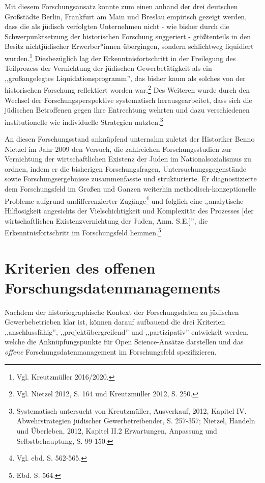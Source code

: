 Mit diesem Forschungsansatz konnte zum einen anhand der drei deutschen Großstädte Berlin, Frankfurt am Main und Breslau empirisch  gezeigt werden, dass die als jüdisch verfolgten Unternehmen nicht - wie bisher durch die Schwerpunktsetzung der historischen Forschung suggeriert - größtenteils in den Besitz nichtjüdischer Erwerber*innen übergingen, sondern schlichtweg liquidiert wurden.\footnote{Vgl. Kreutzmüller 2016/2020.} Diesbezüglich lag der Erkenntnisfortschritt in der Freilegung des Teilprozess der Vernichtung der jüdischen Gewerbetätigkeit als ein ,,großangelegtes Liquidationsprogramm'', das bisher kaum als solches von der historischen Forschung reflektiert worden war.\footnote{Vgl. Nietzel 2012, S. 164 und Kreutzmüller 2012, S. 250.} Des Weiteren wurde durch den Wechsel der Forschungsperspektive systematisch herausgearbeitet, dass sich die jüdischen Betroffenen gegen ihre Entrechtung wehrten und dazu verschiedenen institutionelle wie individuelle Strategien nutzten.\footnote{Systematisch untersucht von Kreutzmüller, Ausverkauf, 2012, Kapitel IV. Abwehrstrategien jüdischer Gewerbetreibender, S. 257-357; Nietzel, Handeln und Überleben, 2012, Kapitel II.2 Erwartungen, Anpassung und Selbstbehauptung, S. 99-150.}

An diesen Forschungsstand anknüpfend unternahm zuletzt der Historiker Benno Nietzel im Jahr 2009 den Versuch, die zahlreichen Forschungsstudien zur Vernichtung der wirtschaftlichen Existenz der Juden im Nationalsozialismus zu ordnen, indem er die bisherigen Forschungsfragen, Untersuchungsgegenstände sowie Forschungsergebnisse zusammenfasste und strukturierte. Er diagnostizierte dem Forschungsfeld im Großen und Ganzen weiterhin methodisch-konzeptionelle Probleme aufgrund undifferenzierter Zugänge\footnote{Vgl. ebd. S. 562-565.} und folglich eine ,,analytische Hilflosigkeit angesichts der Vielschichtigkeit und Komplexität des Prozesses [der wirtschaftlichen Existenzvernichtung der Juden, Anm. S.E.]'', die Erkenntnisfortschritt im Forschungsfeld hemmen.\footnote{Ebd. S. 564.}

\section{Kriterien des offenen Forschungsdatenmanagements}

Nachdem der historiographische Kontext der Forschungsdaten zu jüdischen Gewerbebetrieben klar ist, können darauf aufbauend die drei Kriterien ,,anschlussfähig'', ,,projektübergreifend'' und ,,partizipativ'' entwickelt werden, welche die Anknüpfungspunkte für Open Science-Ansätze darstellen und das \textit{offene} Forschungsdatenmanagement im Forschungsfeld spezifizieren.


